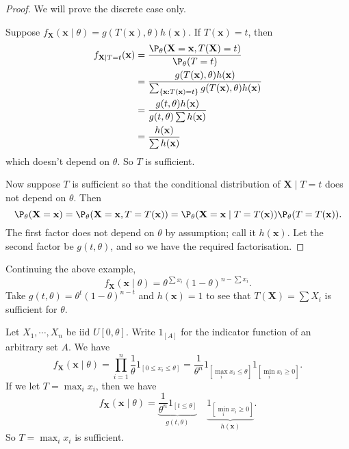 \documentclass[a4paper]{article}
\begin{document}
\begin{proof}
  We will prove the discrete case only.

  Suppose $f_\mathbf{X}(\mathbf{x}\mid \theta) = g(T(\mathbf{x}), \theta)h(\mathbf{x})$. If $T(\mathbf{x}) = t$, then
  \begin{align*}
    f_{\mathbf{X}\mid T = t}(\mathbf{x}) &= \frac{\P_\theta(\mathbf{X} = \mathbf{x}, T(\mathbf{X}) = t)}{\P_\theta (T = t)}\\
    &= \frac{g(T(\mathbf{x}), \theta)h(\mathbf{x})}{\sum_{\{\mathbf{x}:T(\mathbf{x}) = t\}}g(T(\mathbf{x}), \theta)h(\mathbf{x})}\\
    &=\frac{g(t, \theta)h(\mathbf{x})}{g(t, \theta)\sum h(\mathbf{x})}\\
    &= \frac{h(\mathbf{x})}{\sum h(\mathbf{x})}
  \end{align*}
  which doesn't depend on $\theta$. So $T$ is sufficient.

  Now suppose $T$ is sufficient so that the conditional distribution of $\mathbf{X}\mid T = t$ does not depend on $\theta$. Then
  \[
    \P_\theta(\mathbf{X} = \mathbf{x}) = \P_\theta(\mathbf{X} = \mathbf{x}, T=T(\mathbf{x})) = \P_\theta(\mathbf{X} = \mathbf{x}\mid T = T(\mathbf{x}))\P_\theta (T = T(\mathbf{x})).
  \]
  The first factor does not depend on $\theta$ by assumption; call it $h(\mathbf{x})$. Let the second factor be $g(t, \theta)$, and so we have the required factorisation.
\end{proof}

\begin{eg}
  Continuing the above example,
  \[
    f_\mathbf{X}(\mathbf{x}\mid \theta) = \theta^{\sum x_i}(1 - \theta)^{n - \sum x_i}.
  \]
  Take $g(t, \theta) = \theta^t(1 - \theta)^{n - t}$ and $h(\mathbf{x}) = 1$ to see that $T(\mathbf{X}) = \sum X_i$ is sufficient for $\theta$.
\end{eg}

\begin{eg}
  Let $X_1, \cdots, X_n$ be iid $U[0, \theta]$. Write $1_{[A]}$ for the indicator function of an arbitrary set $A$. We have
  \[
    f_\mathbf{X}(\mathbf{x}\mid \theta) = \prod_{i = 1}^n \frac{1}{\theta}1_{[0 \leq x_i\leq \theta]} = \frac{1}{\theta^n}1_{[\max_i x_i \leq \theta]}1_{[\min_i x_i\geq 0]}.
  \]
  If we let $T = \max_i x_i$, then we have
  \[
    f_\mathbf{X}(\mathbf{x}\mid \theta) = \underbrace{\frac{1}{\theta^n}1_{[t \leq \theta]}}_{g(t, \theta)}\quad \underbrace{1_{[\min_i x_i \geq 0]}}_{h(\mathbf{x})}.
  \]
  So $T = \max_i x_i$ is sufficient.
\end{eg}
\end{document}
